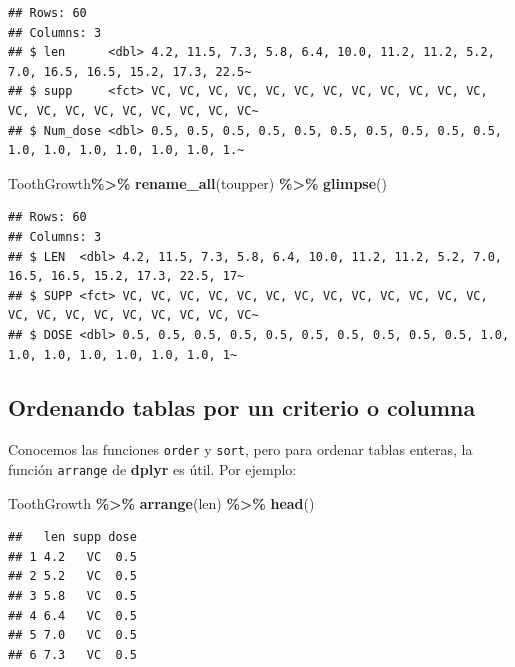\documentclass[
]{book}
\newenvironment{Shaded}{\begin{snugshade}}{\end{snugshade}}
\newcommand{\FunctionTok}[1]{\textcolor[rgb]{0.13,0.29,0.53}{\textbf{#1}}}
\newcommand{\NormalTok}[1]{#1}
\newcommand{\SpecialCharTok}[1]{\textcolor[rgb]{0.81,0.36,0.00}{\textbf{#1}}}
\begin{document}
\begin{verbatim}
## Rows: 60
## Columns: 3
## $ len      <dbl> 4.2, 11.5, 7.3, 5.8, 6.4, 10.0, 11.2, 11.2, 5.2, 7.0, 16.5, 16.5, 15.2, 17.3, 22.5~
## $ supp     <fct> VC, VC, VC, VC, VC, VC, VC, VC, VC, VC, VC, VC, VC, VC, VC, VC, VC, VC, VC, VC, VC~
## $ Num_dose <dbl> 0.5, 0.5, 0.5, 0.5, 0.5, 0.5, 0.5, 0.5, 0.5, 0.5, 1.0, 1.0, 1.0, 1.0, 1.0, 1.0, 1.~
\end{verbatim}

\begin{Shaded}
\begin{Highlighting}[]
\NormalTok{ToothGrowth}\SpecialCharTok{\%\textgreater{}\%} \FunctionTok{rename\_all}\NormalTok{(toupper) }\SpecialCharTok{\%\textgreater{}\%} \FunctionTok{glimpse}\NormalTok{()}
\end{Highlighting}
\end{Shaded}

\begin{verbatim}
## Rows: 60
## Columns: 3
## $ LEN  <dbl> 4.2, 11.5, 7.3, 5.8, 6.4, 10.0, 11.2, 11.2, 5.2, 7.0, 16.5, 16.5, 15.2, 17.3, 22.5, 17~
## $ SUPP <fct> VC, VC, VC, VC, VC, VC, VC, VC, VC, VC, VC, VC, VC, VC, VC, VC, VC, VC, VC, VC, VC, VC~
## $ DOSE <dbl> 0.5, 0.5, 0.5, 0.5, 0.5, 0.5, 0.5, 0.5, 0.5, 0.5, 1.0, 1.0, 1.0, 1.0, 1.0, 1.0, 1.0, 1~
\end{verbatim}

\hfill\break

\subsection{Ordenando tablas por un criterio o columna}\label{ordenando-tablas-por-un-criterio-o-columna-1}

\hfill\break
Conocemos las funciones \texttt{order} y \texttt{sort}, pero para ordenar tablas enteras, la función \texttt{arrange} de \textbf{dplyr} es útil.
Por ejemplo:

\begin{Shaded}
\begin{Highlighting}[]
\NormalTok{ToothGrowth }\SpecialCharTok{\%\textgreater{}\%} \FunctionTok{arrange}\NormalTok{(len) }\SpecialCharTok{\%\textgreater{}\%} \FunctionTok{head}\NormalTok{()}
\end{Highlighting}
\end{Shaded}

\begin{verbatim}
##   len supp dose
## 1 4.2   VC  0.5
## 2 5.2   VC  0.5
## 3 5.8   VC  0.5
## 4 6.4   VC  0.5
## 5 7.0   VC  0.5
## 6 7.3   VC  0.5
\end{verbatim}
\end{document}
